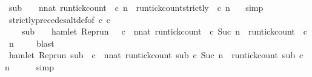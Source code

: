 \begin{isabellebody}
\ {\isacartoucheopen}sub\ {\isasymin}\ {\isacharbraceleft}\ {\isasymrho}{\isachardot}\ {\isasymforall}n{\isacharcolon}{\isacharcolon}nat{\isachardot}\ {\isacharparenleft}run{\isacharunderscore}tick{\isacharunderscore}count\ {\isasymrho}\ c\ n{\isacharparenright}\ {\isasymle}\ {\isacharparenleft}run{\isacharunderscore}tick{\isacharunderscore}count{\isacharunderscore}strictly\ {\isasymrho}\ c\ n{\isacharparenright}\ {\isacharbraceright}{\isacartoucheclose}\ \isamarkupfalse%
\ simp\isanewline
\ \ \isamarkupfalse%
\ strictly{\isacharunderscore}precedes{\isacharunderscore}alt{\isacharunderscore}def{}{\isacharbrackleft}of\ {\isacartoucheopen}c\ {\isacartoucheopen}c\ \ \isamarkupfalse%
\isanewline
\ \ \ \ {\isacartoucheopen}sub\ {\isasymin}\ {\isacharbraceleft}\ {\isasymrho}{\isachardot}\ {\isacharparenleft}{\isasymnot}hamlet\ {\isacharparenleft}{\isacharparenleft}Rep{\isacharunderscore}run\ {\isasymrho}{\isacharparenright}\ {}\ c\ {\isasymand}\ {\isacharparenleft}{\isasymforall}n{\isacharcolon}{\isacharcolon}nat{\isachardot}\ {\isacharparenleft}run{\isacharunderscore}tick{\isacharunderscore}count\ {\isasymrho}\ c\ {\isacharparenleft}Suc\ n{\isacharparenright}{\isacharparenright}\ {\isasymle}\ {\isacharparenleft}run{\isacharunderscore}tick{\isacharunderscore}count\ {\isasymrho}\ c\ n{\isacharparenright}{\isacharparenright}\ {\isacharbraceright}{\isacartoucheclose}\isanewline
\ \ \isamarkupfalse%
\ blast\isanewline
\ \ \isamarkupfalse%
\ {\isacartoucheopen}{\isacharparenleft}{\isasymnot}hamlet\ {\isacharparenleft}{\isacharparenleft}Rep{\isacharunderscore}run\ sub{\isacharparenright}\ {}\ c\ {\isasymand}\ {\isacharparenleft}{\isasymforall}n{\isacharcolon}{\isacharcolon}nat{\isachardot}\ {\isacharparenleft}run{\isacharunderscore}tick{\isacharunderscore}count\ sub\ c\ {\isacharparenleft}Suc\ n{\isacharparenright}{\isacharparenright}\ {\isasymle}\ {\isacharparenleft}run{\isacharunderscore}tick{\isacharunderscore}count\ sub\ c\ n{\isacharparenright}{\isacharparenright}{\isacartoucheclose}\isanewline
\ \ \ \ \isamarkupfalse%
\ simp\isanewline
\ \ \isamarkupfalse%

\end{isabellebody}
